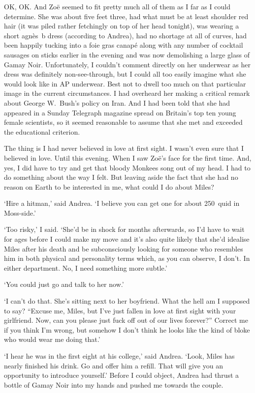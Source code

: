 OK, OK. And Zoë seemed to fit pretty much all of them as I far
as I could determine. She was about five feet three, had what must be at least shoulder red
hair (it was piled rather fetchingly on top of her head tonight), was
wearing a short agnès~b dress (according to Andrea), had no shortage at all of curves,
had been happily tucking into a foie gras canapé along with any
number of cocktail sausages on sticks earlier in the evening and was
now demolishing a large glass of Gamay Noir. Unfortunately,
I couldn't comment directly on her underwear as her dress was
definitely non-see-through, but I could all too easily imagine what
she would look like in AP underwear. Best not to dwell too much on
that particular image in the current circumstances. I had
overheard her making a critical remark about George W.~Bush's policy
on Iran. And I had been told that she had appeared in a {\twelvesl
Sunday Telegraph\/} magazine spread on Britain's top ten young
female scientists, so it seemed reasonable to assume that she met
and exceeded the educational criterion.

The thing is I had never believed in love at first sight. I wasn't
even sure that I believed in love. Until this evening. When I saw
Zoë's face for the first time. And, yes, I did have to try and
get that bloody Monkees song out of my head. I had to do
something about the way I felt. But leaving aside the fact that she had no reason on Earth to be
interested in me, what could I do about Miles?

`Hire a hitman,' said Andrea. `I believe you can get one for about
250~quid in Moss-side.'

`Too risky,' I said. `She'd be in shock for months afterwards, so
I'd have to wait for ages before I could make my move and it's also
quite likely that she'd idealise Miles after his death and be
subconsciously looking for someone who resembles him in both
physical and personality terms which, as you can observe, I don't. In
either department. No, I need something more subtle.'

`You could just go and talk to her now.'

`I can't do that. She's sitting next to her boyfriend.
What the hell am I supposed to say? ``Excuse me, Miles, but I've
just fallen in love at first sight with your girlfriend. Now, can
you please just fuck off out of our lives forever?'' Correct me if
you think I'm wrong, but somehow I don't think he looks like the
kind of bloke who would wear me doing that.'

`I hear he was in the first eight at his college,' said Andrea. `Look, Miles has
nearly finished his drink. Go and offer him a refill. That will give
you an opportunity to introduce yourself.' Before I could object,
Andrea had thrust a bottle of Gamay Noir into my hands and pushed me
towards the couple.

